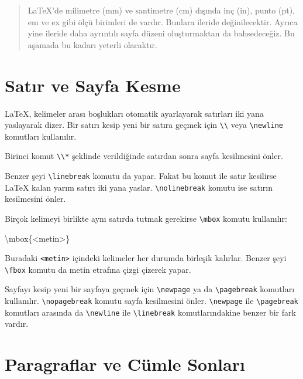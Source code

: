 \documentclass[
  10pt,
]{scrbook}
\newenvironment{Shaded}{\begin{snugshade}}{\end{snugshade}}
\newcommand{\FunctionTok}[1]{\textcolor[rgb]{0.00,0.00,0.00}{#1}}
\newcommand{\NormalTok}[1]{#1}
\theoremstyle{definition}
\theoremstyle{definition}
\theoremstyle{definition}
\theoremstyle{definition}
\theoremstyle{remark}
\begin{document}
\begin{quote}
LaTeX'de milimetre (mm) ve santimetre (cm) dışında inç (in), punto (pt), em ve ex gibi ölçü birimleri de vardır. Bunlara ileride değinilecektir. Ayrıca yine ileride daha ayrıntılı sayfa düzeni oluşturmaktan da bahsedeceğiz. Bu aşamada bu kadarı yeterli olacaktır.
\end{quote}

\hypertarget{satux131r-ve-sayfa-kesme}{%
\section{Satır ve Sayfa Kesme}\label{satux131r-ve-sayfa-kesme}}

LaTeX, kelimeler arası boşlukları otomatik ayarlayarak satırları iki yana yaslayarak dizer. Bir satırı kesip yeni bir satıra geçmek için \texttt{\textbackslash{}\textbackslash{}} veya \texttt{\textbackslash{}newline} komutları kullanılır.

Birinci komut \texttt{\textbackslash{}\textbackslash{}*} şeklinde verildiğinde satırdan sonra sayfa kesilmesini önler.

Benzer şeyi \texttt{\textbackslash{}linebreak} komutu da yapar. Fakat bu komut ile satır kesilirse LaTeX kalan yarım satırı iki yana yaslar. \texttt{\textbackslash{}nolinebreak} komutu ise satırın kesilmesini önler.

Birçok kelimeyi birlikte aynı satırda tutmak gerekirse \texttt{\textbackslash{}mbox} komutu kullanılır:

\begin{Shaded}
\begin{Highlighting}[]
\FunctionTok{\textbackslash{}mbox}\NormalTok{\{\textless{}metin\textgreater{}\}}
\end{Highlighting}
\end{Shaded}

Buradaki \texttt{\textless{}metin\textgreater{}} içindeki kelimeler her durumda birleşik kalırlar. Benzer şeyi \texttt{\textbackslash{}fbox} komutu da metin etrafına çizgi çizerek yapar.

Sayfayı kesip yeni bir sayfaya geçmek için \texttt{\textbackslash{}newpage} ya da \texttt{\textbackslash{}pagebreak} komutları kullanılır. \texttt{\textbackslash{}nopagebreak} komutu sayfa kesilmesini önler. \texttt{\textbackslash{}newpage} ile \texttt{\textbackslash{}pagebreak} komutları arasında da \texttt{\textbackslash{}newline} ile \texttt{\textbackslash{}linebreak} komutlarındakine benzer bir fark vardır.

\hypertarget{paragraflar-ve-cuxfcmle-sonlarux131}{%
\section{Paragraflar ve Cümle Sonları}\label{paragraflar-ve-cuxfcmle-sonlarux131}}
\end{document}
